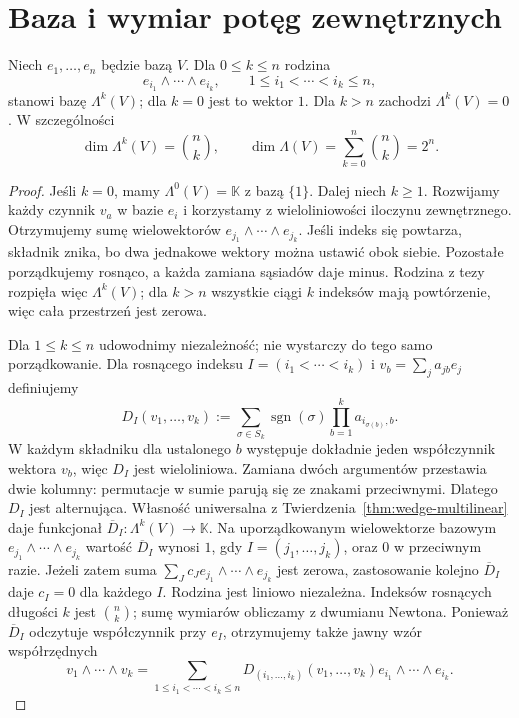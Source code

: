 \section{Baza i wymiar potęg zewnętrznych}
\label{sec:baza-zewnetrzna}

\begin{twierdzenie}
\label{thm:wedge-baza}
Niech $e_1,\ldots,e_n$ będzie bazą $V$. Dla $0\leq k\leq n$
rodzina
\[
 e_{i_1}\wedge\cdots\wedge e_{i_k},
 \qquad 1\leq i_1<\cdots<i_k\leq n,
\]
stanowi bazę $\Lambda^k(V)$; dla $k=0$ jest to wektor $1$.
Dla $k>n$ zachodzi $\Lambda^k(V)=0$. W szczególności
\begin{equation}\label{eq:wedge-wymiar}
 \dim\Lambda^k(V)=\binom nk,\qquad
 \dim\Lambda(V)=\sum_{k=0}^n\binom nk=2^n.
\end{equation}
\end{twierdzenie}
\begin{proof}
Jeśli $k=0$, mamy $\Lambda^0(V)=\mathbb K$ z bazą $\{1\}$.
Dalej niech $k\geq1$.
Rozwijamy każdy czynnik $v_a$ w bazie $e_i$ i korzystamy
z wieloliniowości iloczynu zewnętrznego. Otrzymujemy sumę
wielowektorów $e_{j_1}\wedge\cdots\wedge e_{j_k}$.
Jeśli indeks się powtarza, składnik znika, bo dwa jednakowe
wektory można ustawić obok siebie. Pozostałe porządkujemy
rosnąco, a każda zamiana sąsiadów daje minus. Rodzina
z tezy rozpięła więc $\Lambda^k(V)$; dla $k>n$ wszystkie
ciągi $k$ indeksów mają powtórzenie, więc
cała przestrzeń jest zerowa.

Dla $1\leq k\leq n$ udowodnimy niezależność;
nie wystarczy do tego samo porządkowanie.
Dla rosnącego indeksu $I=(i_1<\cdots<i_k)$ i
$v_b=\sum_j a_{jb}e_j$ definiujemy
\begin{equation}\label{eq:wedge-wspolrzedne-minor}
 D_I(v_1,\ldots,v_k)
 :=\sum_{\sigma\in S_k}\operatorname{sgn}(\sigma)
 \prod_{b=1}^k a_{i_{\sigma(b)},b}.
\end{equation}
W każdym składniku dla ustalonego $b$ występuje dokładnie
jeden współczynnik wektora $v_b$, więc $D_I$ jest
wieloliniowa. Zamiana dwóch argumentów przestawia dwie
kolumny: permutacje w sumie parują się ze znakami przeciwnymi.
Dlatego $D_I$ jest alternująca. Własność uniwersalna z
Twierdzenia~\ref{thm:wedge-multilinear} daje funkcjonał
$\overline D_I\colon\Lambda^k(V)\to\mathbb K$.
Na uporządkowanym wielowektorze bazowym $e_{j_1}\wedge\cdots
\wedge e_{j_k}$ wartość $\overline D_I$ wynosi $1$,
gdy $I=(j_1,\ldots,j_k)$, oraz $0$ w przeciwnym razie.
Jeżeli zatem suma $\sum_J c_J e_{j_1}\wedge\cdots\wedge e_{j_k}$
jest zerowa, zastosowanie kolejno $\overline D_I$ daje
$c_I=0$ dla każdego $I$. Rodzina jest liniowo niezależna.
Indeksów rosnących długości $k$ jest $\binom nk$;
sumę wymiarów obliczamy z dwumianu Newtona.
Ponieważ $\overline D_I$ odczytuje współczynnik przy $e_I$,
otrzymujemy także jawny wzór współrzędnych
\begin{equation}\label{eq:wedge-rozwiniecie-minory}
 v_1\wedge\cdots\wedge v_k
 =\sum_{1\leq i_1<\cdots<i_k\leq n}
 D_{(i_1,\ldots,i_k)}(v_1,\ldots,v_k)
 e_{i_1}\wedge\cdots\wedge e_{i_k}.
\end{equation}
\end{proof}

